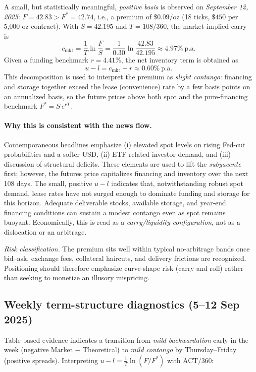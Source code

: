 \documentclass[10pt,a4paper]{article} %
\begin{document}
A small, but statistically meaningful, \emph{positive basis} is observed on \emph{September 12, 2025}: \(F=42.83>F^{*}=42.74\), i.e., a premium of \(\$0.09/\mathrm{oz}\) (18 ticks, \(\$450\) per 5{,}000-oz contract). With \(S=42.195\) and \(T=108/360\), the market-implied carry is
\[
c_{\mathrm{mkt}}=\frac{1}{T}\ln\!\frac{F}{S}=\frac{1}{0.30}\ln\!\frac{42.83}{42.195}\approx 4.97\% \ \text{p.a.}
\]
Given a funding benchmark \(r=4.41\%\), the net inventory term is obtained as
\[
u-l=c_{\mathrm{mkt}}-r\approx 0.60\%\ \text{p.a.}
\]
This decomposition is used to interpret the premium as \emph{slight contango}: financing and storage together exceed the lease (convenience) rate by a few basis points on an annualized basis, so the future prices above both spot and the pure-financing benchmark \(F^{*}=S\,e^{rT}\).


\paragraph{Why this is consistent with the news flow.}
Contemporaneous headlines emphasize (i) elevated spot levels on rising Fed-cut probabilities and a softer USD, (ii) ETF-related investor demand, and (iii) discussion of structural deficits. These elements are used to lift the \emph{subyacente} first; however, the futures price capitalizes financing and inventory over the next 108 days. The small, positive \(u-l\) indicates that, notwithstanding robust spot demand, lease rates have not surged enough to dominate funding and storage for this horizon. Adequate deliverable stocks, available storage, and year-end financing conditions can sustain a modest contango even as spot remains buoyant. Economically, this is read as a \emph{carry/liquidity configuration}, not as a dislocation or an arbitrage.




\medskip
\noindent\emph{Risk classification.} The premium sits well within typical no-arbitrage bands once bid–ask, exchange fees, collateral haircuts, and delivery frictions are recognized. Positioning should therefore emphasize curve-shape risk (carry and roll) rather than seeking to monetize an illusory mispricing.



\subsection{Weekly term-structure diagnostics (5–12 Sep 2025)}
Table-based evidence indicates a transition from \emph{mild backwardation} early in the week (negative Market \(-\) Theoretical) to \emph{mild contango} by Thursday–Friday (positive spreads). Interpreting \(u-l=\tfrac{1}{T}\ln(F/F^{*})\) with ACT/360:
\end{document}
